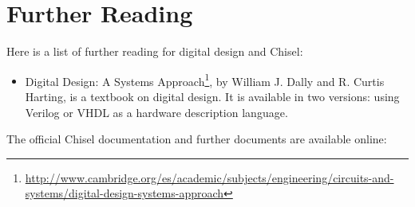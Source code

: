 \documentclass[%
    10pt,
    headinclude, footexclude,
    openright, %
    notitlepage,
    cleardoubleempty,
    headsepline,
    pointlessnumbers,
    bibtotoc, idxtotoc,
    ]{scrbook}
\newcommand{\myref}[2]{\href{#1}{#2}}
\renewcommand{\myref}[2]{{#2}{\footnote{\url{#1}}}}
\begin{document}
\section{Further Reading}

Here is a list of further reading for digital design and Chisel:
\begin{itemize}
\item \myref{http://www.cambridge.org/es/academic/subjects/engineering/circuits-and-systems/digital-design-systems-approach}{Digital Design: A Systems Approach}, by William J. Dally and R. Curtis Harting,
is a textbook on digital design. It is available in two versions: using Verilog or VHDL as a hardware description language.
\end{itemize}

The official Chisel documentation and further documents are available online:
\end{document}
